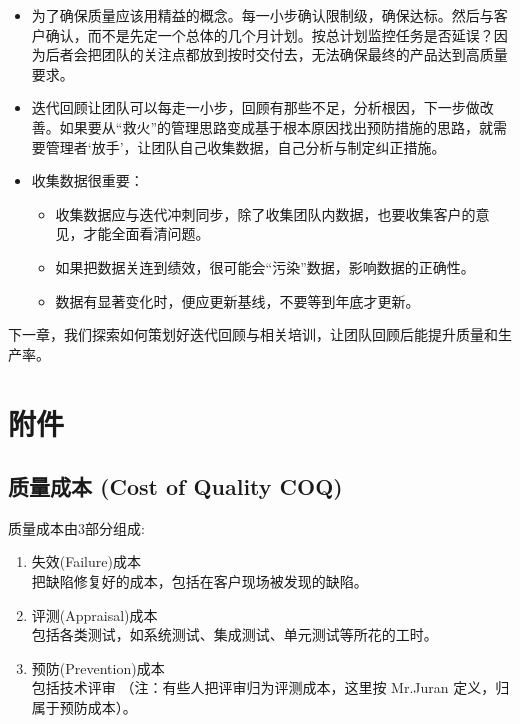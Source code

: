 \begin{itemize}
\tightlist
\item
  为了确保质量应该用精益的概念。每一小步确认限制级，确保达标。然后与客户确认，而不是先定一个总体的几个月计划。按总计划监控任务是否延误？因为后者会把团队的关注点都放到按时交付去，无法确保最终的产品达到高质量要求。
\item
  迭代回顾让团队可以每走一小步，回顾有那些不足，分析根因，下一步做改善。如果要从``救火''的管理思路变成基于根本原因找出预防措施的思路，就需要管理者`放手'，让团队自己收集数据，自己分析与制定纠正措施。
\item
  收集数据很重要：

  \begin{itemize}
  \tightlist
  \item
    收集数据应与迭代冲刺同步，除了收集团队内数据，也要收集客户的意见，才能全面看清问题。
  \item
    如果把数据关连到绩效，很可能会“污染”数据，影响数据的正确性。
  \item
    数据有显著变化时，便应更新基线，不要等到年底才更新。
  \end{itemize}
\end{itemize}

下一章，我们探索如何策划好迭代回顾与相关培训，让团队回顾后能提升质量和生产率。

\hypertarget{ux9644ux4ef6}{%
\section{附件}\label{ux9644ux4ef6}}

\hypertarget{ux8d28ux91cfux6210ux672c-coq-cost-of-quality}{%
\subsection{质量成本  (Cost of Quality COQ)}\label{ux8d28ux91cfux6210ux672c-coq-cost-of-quality}}

质量成本由3部分组成:

\begin{enumerate}
\tightlist
\item
  失效(Failure)成本\\
  把缺陷修复好的成本，包括在客户现场被发现的缺陷。
\item
  评测(Appraisal)成本\\
  包括各类测试，如系统测试、集成测试、单元测试等所花的工时。
\item
  预防(Prevention)成本\\
  包括技术评审 （注：有些人把评审归为评测成本，这里按 Mr.Juran
  定义，归属于预防成本）。
\end{enumerate}

